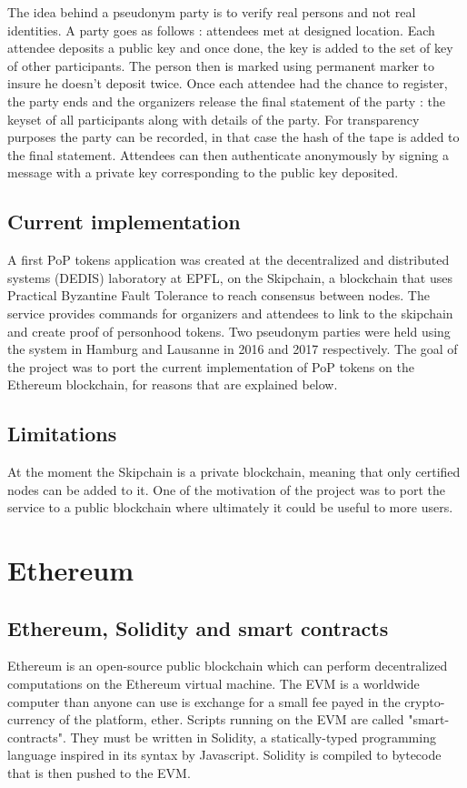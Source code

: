 \documentclass[11pt, a4paper, twoside, openright]{book} %
\begin{document}
The idea behind a pseudonym party is to verify real persons and not real identities. A party goes as follows :  attendees met at designed location. Each attendee deposits a public key and once done, the key is added to the set of key of other participants. The person then is marked using permanent marker to insure he doesn't deposit twice. Once each attendee had the chance to register, the party ends and the organizers release the final statement of the party : the keyset of all participants along with details of the party. For transparency purposes the party can be recorded, in that case the hash of the tape is added to the final statement. Attendees can then authenticate anonymously by signing a message with a private key corresponding to the public key deposited.

\subsection{Current implementation}
A first PoP tokens application was created at the decentralized and distributed systems (DEDIS) laboratory at EPFL, on the Skipchain, a blockchain that uses Practical Byzantine Fault Tolerance to reach consensus between nodes. The service provides commands for organizers and attendees to link to the skipchain and create proof of personhood tokens. Two pseudonym parties were held using the system in Hamburg and Lausanne in 2016 and 2017 respectively.
The goal of the project was to port the current implementation of PoP tokens on the Ethereum blockchain, for reasons that are explained below.

\subsection{Limitations}
At the moment the Skipchain is a private blockchain, meaning that only certified nodes can be added to it. One of the motivation of the project was to port the service to a public blockchain where ultimately it could be useful to more users.

\section{Ethereum}

\subsection{Ethereum, Solidity and smart contracts}
Ethereum is an open-source public blockchain which can perform decentralized computations on the Ethereum virtual machine. The EVM is a worldwide computer than anyone can use is exchange for a small fee payed in the crypto-currency of the platform, ether. Scripts running on the EVM are called "smart-contracts". They must be written in Solidity, a statically-typed programming language inspired in its syntax by Javascript. Solidity is compiled to bytecode that is then pushed to the EVM.
\end{document}
